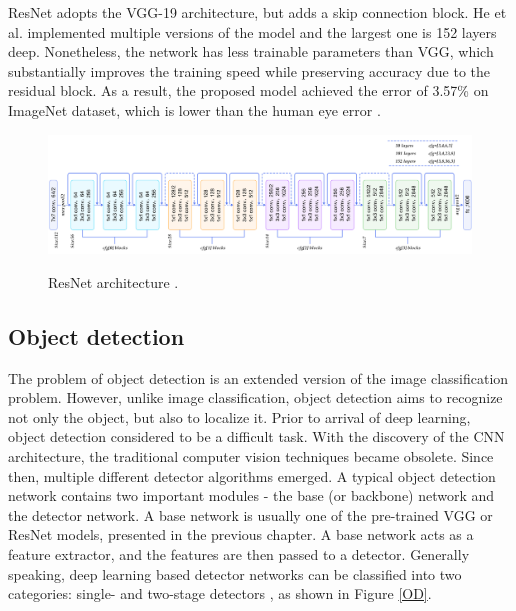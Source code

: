 ResNet adopts the VGG-19 architecture, but adds a skip connection block. He et al. implemented multiple versions of the model and the largest one is 152 layers deep. Nonetheless, the network has less trainable parameters than VGG, which substantially improves the training speed while preserving accuracy due to the residual block. As a result, the proposed model achieved the error of 3.57\% on ImageNet dataset, which is lower than the human eye error \cite{He2015}.

\begin{figure}[htb]
	\begin{center}
		\includegraphics[width=16cm]{./resnetFull.png}
	\end{center}
	\caption{ResNet architecture \cite{resnet50}.}
	\begin{center}
		\label{resnetFull}
	\end{center}
\end{figure}
\FloatBarrier




\subsection{Object detection}
\label{obj_detection_section} 
The problem of object detection is an extended version of the image classification problem. However, unlike image classification, object detection aims to recognize not only the object, but also to localize it. Prior to arrival of deep learning, object detection considered to be a difficult task. With the discovery of the CNN architecture, the traditional computer vision techniques became obsolete. Since then, multiple different detector algorithms emerged. A typical object detection network contains two important modules - the base (or backbone) network  and the detector network. A base network is usually one of the pre-trained VGG or ResNet models, presented in the previous chapter. A base network acts as a feature extractor, and the features are then passed to a detector. Generally speaking, deep learning based detector networks can be classified into two categories: single- and two-stage detectors \cite{Zaidi2021}, as shown in Figure \ref{OD}.  

